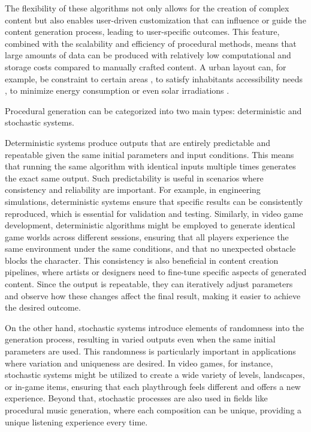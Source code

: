 The flexibility of these algorithms not only allows for the creation of complex content but also enables user-driven customization that can influence or guide the content generation process, leading to user-specific outcomes. This feature, combined with the scalability and efficiency of procedural methods, means that large amounts of data can be produced with relatively low computational and storage costs compared to manually crafted content. A urban layout can, for example, be constraint to certain areas \cite{Xiaochen2021}, to satisfy inhabitants accessibility needs \cite{Lima2022}, to minimize energy consumption \cite{Shi2017} or even solar irradiations \cite{Vermeulen2015}.

Procedural generation can be categorized into two main types: deterministic and stochastic systems.

Deterministic systems produce outputs that are entirely predictable and repeatable given the same initial parameters and input conditions. This means that running the same algorithm with identical inputs multiple times generates the exact same output. Such predictability is useful in scenarios where consistency and reliability are important. For example, in engineering simulations, deterministic systems ensure that specific results can be consistently reproduced, which is essential for validation and testing. Similarly, in video game development, deterministic algorithms might be employed to generate identical game worlds across different sessions, ensuring that all players experience the same environment under the same conditions, and that no unexpected obstacle blocks the character. This consistency is also beneficial in content creation pipelines, where artists or designers need to fine-tune specific aspects of generated content. Since the output is repeatable, they can iteratively adjust parameters and observe how these changes affect the final result, making it easier to achieve the desired outcome.

On the other hand, stochastic systems introduce elements of randomness into the generation process, resulting in varied outputs even when the same initial parameters are used. This randomness is particularly important in applications where variation and uniqueness are desired. In video games, for instance, stochastic systems might be utilized to create a wide variety of levels, landscapes, or in-game items, ensuring that each playthrough feels different and offers a new experience. Beyond that, stochastic processes are also used in fields like procedural music generation, where each composition can be unique, providing a unique listening experience every time.

